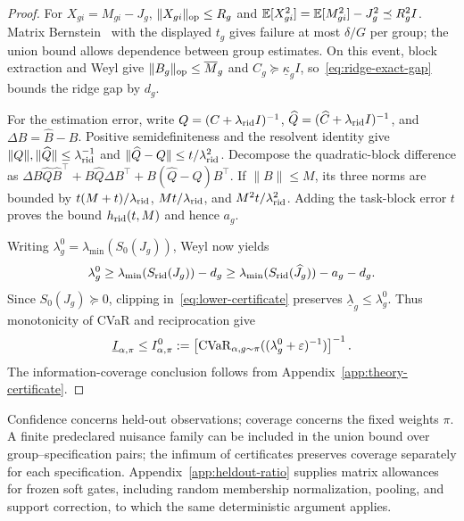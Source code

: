 \begin{proof}
For $X_{gi}=M_{gi}-J_g$, $\lVert X_{gi}\rVert_{\mathrm{op}}\le R_g$ and $\mathbb{E}[X_{gi}^2]=\mathbb{E}[M_{gi}^2]-J_g^2\preceq R_g^2I$. Matrix Bernstein~\citep[Theorem~1.4]{tropp2012user} with the displayed $t_g$ gives failure at most $\delta/G$ per group; the union bound allows dependence between group estimates. On this event, block extraction and Weyl give $\lVert B_g\rVert_{\mathrm{op}}\le\overline M_g$ and $C_g\succeq\underline\kappa_gI$, so~\eqref{eq:ridge-exact-gap} bounds the ridge gap by $d_g$.

For the estimation error, write $Q=(C+\lambda_{\mathrm{rid}}I)^{-1}$, $\widehat Q=(\widehat C+\lambda_{\mathrm{rid}}I)^{-1}$, and $\Delta B=\widehat B-B$. Positive semidefiniteness and the resolvent identity give $\lVert Q\rVert,\lVert\widehat Q\rVert\le\lambda_{\mathrm{rid}}^{-1}$ and $\lVert\widehat Q-Q\rVert\le t/\lambda_{\mathrm{rid}}^2$. Decompose the quadratic-block difference as $\Delta B\widehat Q\widehat B^\top+B\widehat Q\Delta B^\top+B(\widehat Q-Q)B^\top$. If $\lVert B\rVert\le M$, its three norms are bounded by $t(M+t)/\lambda_{\mathrm{rid}}$, $Mt/\lambda_{\mathrm{rid}}$, and $M^2t/\lambda_{\mathrm{rid}}^2$. Adding the task-block error $t$ proves the bound $h_{\mathrm{rid}}(t,M)$ and hence $a_g$.

Writing $\lambda_g^0=\lambda_{\min}(S_0(J_g))$, Weyl now yields
\begin{equation}
\lambda_g^0\ge\lambda_{\min}(S_{\mathrm{rid}}(J_g))-d_g
\ge\lambda_{\min}(S_{\mathrm{rid}}(\widehat J_g))-a_g-d_g.
\label{eq:appB-weyl}
\end{equation}
Since $S_0(J_g)\succeq0$, clipping in~\eqref{eq:lower-certificate} preserves $\underline\lambda_g\le\lambda_g^0$. Thus monotonicity of CVaR and reciprocation give
\begin{equation}
\underline I_{\alpha,\pi}\le
I^0_{\alpha,\pi}:=\left[\operatorname{CVaR}_{\alpha,g\sim\pi}
((\lambda_g^0+\varepsilon)^{-1})\right]^{-1}.
\label{eq:appB-certificate-guarantee}
\end{equation}
The information-coverage conclusion follows from Appendix~\ref{app:theory-certificate}.
\end{proof}
Confidence concerns held-out observations; coverage concerns the fixed weights $\pi$. A finite predeclared nuisance family can be included in the union bound over group--specification pairs; the infimum of certificates preserves coverage separately for each specification. Appendix~\ref{app:heldout-ratio} supplies matrix allowances for frozen soft gates, including random membership normalization, pooling, and support correction, to which the same deterministic argument applies.

